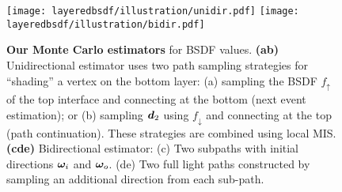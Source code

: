 \begin{figure}[h]
	\centering
	\texttt{[image: layeredbsdf/illustration/unidir.pdf]}
	\texttt{[image: layeredbsdf/illustration/bidir.pdf]}
	\caption[Our Monte Carlo estimators]{\label{fig:layeredbsdf:mc_estimators}
		\textbf{Our Monte Carlo estimators} for BSDF values.
		\textbf{(ab)} Unidirectional estimator uses two path sampling strategies for ``shading'' a vertex on the bottom layer:
		(a) sampling the BSDF $f_\uparrow$ of the top interface and connecting at the bottom (next event estimation); or (b) sampling $\bm{d}_2$ using $f_\downarrow$ and connecting at the top (path continuation). These strategies are combined using local MIS. \textbf{(cde)} Bidirectional estimator: (c) Two subpaths with initial directions $\bm{\omega}_i$ and $\bm{\omega}_o$. (de) Two full light paths constructed by sampling an additional direction from each sub-path.
	}
\end{figure}
